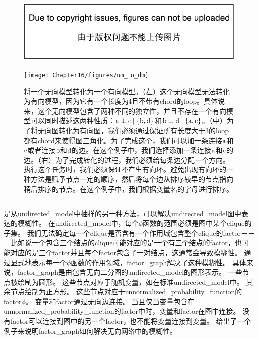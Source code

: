 \begin{figure}[!htb]
\ifOpenSource
\centerline{\includegraphics{figure.pdf}}
\else
	\centerline{\texttt{[image: Chapter16/figures/um\_to\_dm]}}	
\fi
	\caption{将一个无向模型转化为一个有向模型。（左）这个无向模型无法转化为有向模型，因为它有一个长度为$4$且不带有\gls{chord}的\gls{loop}。具体说来，这个无向模型包含了两种不同的独立性，并且不存在一个有向模型可以同时描述这两种性质：$\mathrm{a}\perp \mathrm{c} \mid \{\mathrm{b},\mathrm{d}\}$和$\mathrm{b} \perp \mathrm{d} \mid \{\mathrm{a},\mathrm{c}\}$。（中）为了将无向图转化为有向图，我们必须通过保证所有长度大于$3$的\gls{loop}都有\gls{chord}来使得图三角化。为了完成这个，我们可以加一条连接$\mathrm{a}$和$\mathrm{c}$或者连接$\mathrm{b}$和$\mathrm{d}$的边。在这个例子中，我们选择添加一条连接$\mathrm{a}$和$\mathrm{c}$的边。（右）为了完成转化的过程，我们必须给每条边分配一个方向。执行这个任务时，我们必须保证不产生有向环。避免出现有向环的一种方法是赋予节点一定的顺序，然后将每个边从排序较早的节点指向稍后排序的节点。在这个例子中，我们根据变量名的字母进行排序。}
	\label{fig:um_to_dm}
\end{figure}



\subsection{}
\label{sec:factor_graphs}



是从\gls{undirected_model}中抽样的另一种方法，可以解决\gls{undirected_model}图中表达的模糊性。
在\gls{undirected_model}中，每个$\phi$函数的范围必须是图中某个\gls{clique}的子集。
我们无法确定每一个\gls{clique}是否含有一个作用域包含整个\gls{clique}的\gls{factor}－－－比如说一个包含三个结点的\gls{clique}可能对应的是一个有三个结点的\gls{factor}，也可能对应的是三个\gls{factor}并且每个\gls{factor}包含了一对结点，这通常会导致模糊性。
通过显式地表示每一个$\phi$函数的作用领域，\gls{factor_graph}解决了这种模糊性。
具体来说，\gls{factor_graph}是由包含无向二分图的\gls{undirected_model}的图形表示。
一些节点被绘制为圆形。 
这些节点对应于随机变量，如在标准\gls{undirected_model}中。
其余节点绘制为正方形。
这些节点对应于\gls{unnormalized_probability_function}的\gls{factor}$\phi$。
变量和\gls{factor}通过无向边连接。
当且仅当变量包含在\gls{unnormalized_probability_function}的\gls{factor}中时，变量和\gls{factor}在图中连接。
没有\gls{factor}可以连接到图中的另一个\gls{factor}，也不能将变量连接到变量。
给出了一个例子来说明\gls{factor_graph}如何解决无向网络中的模糊性。


